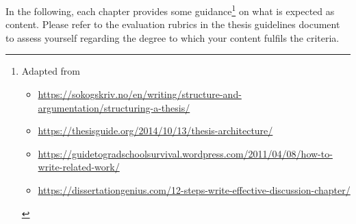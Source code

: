 In the following, each chapter provides some guidance\footnote{Adapted from
\begin{itemize}[nolistsep]
    \item \url{https://sokogskriv.no/en/writing/structure-and-argumentation/structuring-a-thesis/}
    \item \url{https://thesisguide.org/2014/10/13/thesis-architecture/}
    \item \url{https://guidetogradschoolsurvival.wordpress.com/2011/04/08/how-to-write-related-work/}
    \item \url{https://dissertationgenius.com/12-steps-write-effective-discussion-chapter/}
\end{itemize}} on what is expected as content. Please refer to the evaluation rubrics in the thesis guidelines document \cite{guidelines_DP-BTH} to assess yourself regarding the degree to which your content fulfils the criteria.